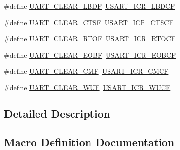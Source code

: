 \begin{DoxyCompactItemize}
\item 
\#define \hyperlink{group___u_a_r_t___i_t___c_l_e_a_r___flags_ga030414d9a93ad994156210644634b73c}{U\+A\+R\+T\+\_\+\+C\+L\+E\+A\+R\+\_\+\+L\+B\+DF}~\hyperlink{group___peripheral___registers___bits___definition_gaae7d1bc407d9e4168d7059043fe8e50f}{U\+S\+A\+R\+T\+\_\+\+I\+C\+R\+\_\+\+L\+B\+D\+CF}
\item 
\#define \hyperlink{group___u_a_r_t___i_t___c_l_e_a_r___flags_gabe0f3bc774ad0b9319732da3be8374cf}{U\+A\+R\+T\+\_\+\+C\+L\+E\+A\+R\+\_\+\+C\+T\+SF}~\hyperlink{group___peripheral___registers___bits___definition_ga8a630d4a5e4ce10ad6fdb9da47126f4f}{U\+S\+A\+R\+T\+\_\+\+I\+C\+R\+\_\+\+C\+T\+S\+CF}
\item 
\#define \hyperlink{group___u_a_r_t___i_t___c_l_e_a_r___flags_ga2735a415d2c7930fdf2818943fd7ddd2}{U\+A\+R\+T\+\_\+\+C\+L\+E\+A\+R\+\_\+\+R\+T\+OF}~\hyperlink{group___peripheral___registers___bits___definition_ga3d2a589246fecc7a05607c22ea7e7ee3}{U\+S\+A\+R\+T\+\_\+\+I\+C\+R\+\_\+\+R\+T\+O\+CF}
\item 
\#define \hyperlink{group___u_a_r_t___i_t___c_l_e_a_r___flags_gaa603f7ce051b012045da4d7e665d6ac6}{U\+A\+R\+T\+\_\+\+C\+L\+E\+A\+R\+\_\+\+E\+O\+BF}~\hyperlink{group___peripheral___registers___bits___definition_ga42bb71b7141c9fe56a06377a0071b616}{U\+S\+A\+R\+T\+\_\+\+I\+C\+R\+\_\+\+E\+O\+B\+CF}
\item 
\#define \hyperlink{group___u_a_r_t___i_t___c_l_e_a_r___flags_ga5815698abf54d69b752bd2c43c2d6ad3}{U\+A\+R\+T\+\_\+\+C\+L\+E\+A\+R\+\_\+\+C\+MF}~\hyperlink{group___peripheral___registers___bits___definition_ga5478360c2639166c4d645b64cbf371be}{U\+S\+A\+R\+T\+\_\+\+I\+C\+R\+\_\+\+C\+M\+CF}
\item 
\#define \hyperlink{group___u_a_r_t___i_t___c_l_e_a_r___flags_ga5081c579f9956a7712248430f3fe129b}{U\+A\+R\+T\+\_\+\+C\+L\+E\+A\+R\+\_\+\+W\+UF}~\hyperlink{group___peripheral___registers___bits___definition_ga0526db5696016ae784e46b80027044fa}{U\+S\+A\+R\+T\+\_\+\+I\+C\+R\+\_\+\+W\+U\+CF}
\end{DoxyCompactItemize}


\subsection{Detailed Description}


\subsection{Macro Definition Documentation}
\mbox{\label{group___u_a_r_t___i_t___c_l_e_a_r___flags_ga5815698abf54d69b752bd2c43c2d6ad3}} 
